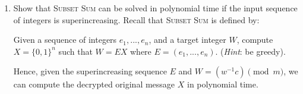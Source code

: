 \documentclass[a4paper]{article}
\begin{document}
\begin{enumerate}[resume, label=\roman*)]
	\item Show that \textsc{Subset Sum} can be solved in polynomial time if the input sequence of integers is superincreasing. Recall that \textsc{Subset Sum} is defined by:
	
	Given a sequence of integers $e_1, ..., e_n$, and a target integer $W$, compute $X = \{0, 1\}^n$ such that $W = EX$ where $E = (e_1, ..., e_n)$. (\emph{Hint}: be greedy).
	
	Hence, given the superincreasing sequence $E$ and $W = (w^{-1}c) \pmod{m}$, we can compute the decrypted original message $X$ in polynomial time.
\end{enumerate}
\end{document}
